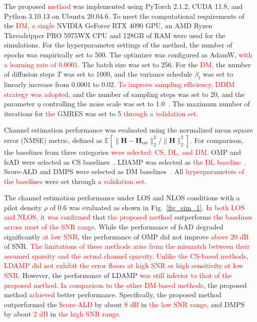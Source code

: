 \documentclass[lettersize,journal]{IEEEtran}
\newcommand{\tred}{\textcolor{red}}
\begin{document}
The proposed \tred{method} was implemented using PyTorch 2.1.2, CUDA 11.8, and Python 3.10.13 on Ubuntu 20.04.6. To meet the computational requirements of the \tred{DM}, \tred{a single} NVIDIA GeForce RTX 4090 GPU, an AMD Ryzen Threadripper PRO 5975WX CPU and 128GB of RAM were used for the simulations. For the hyperparameter settings of the method, the number of epochs was empirically set to 500. The optimizer was configured as AdamW, \tred{with a learning rate of 0.0001}. The batch size was set to 256. %
For the \tred{DM}, the number of diffusion steps $T$ was set to 1000, and the variance schedule $\beta_{t}$ was set to linearly increase from 0.0001 to 0.02. \tred{To improve sampling efficiency, DDIM strategy was adopted,} and the number of sampling steps was set to 20, and the parameter $\eta$ controlling the noise scale was set to 1.0~\cite{songDenoisingDiffusionImplicit2020}. The maximum number of iterations for \tred{the} GMRES was set to 5 \tred{through a validation set}.

Channel estimation performance was evaluated using the normalized mean square error (NMSE) metric, defined as $\mathbb{E}[\|\mathbf{H}-\mathbf{H}_{\text{est}}\|_{2}^{2} / \|\mathbf{H}\|_{2}^{2}]$. For comparison, the baselines from three categories \tred{were selected: CS, DL, and DM}. OMP and fsAD were selected as CS baselines~\cite{mendez-rialHybridMIMOArchitectures2016,zhangAtomicNormDenoisingBased2018}. LDAMP was selected as \tred{the DL baseline}~\cite{heDeepLearningBasedChannel2018}. Score-ALD and DMPS were selected as DM baselines~\cite{arvinteMIMOChannelEstimation2023,zhouGenerativeDiffusionModels2025}. All \tred{hyperparameters of the baselines} were set through \tred{a validation set}.

The channel estimation performance under LOS and NLOS conditions with a pilot density $\rho$ of 0.6 was evaluated as shown in Fig.~\ref{fig_sim_1}. \tred{In both LOS and NLOS, it was confirmed} that \tred{the proposed method} outperforms \tred{the baselines across most of the SNR range}. While the performance of fsAD degraded significantly \tred{at low SNR}, the performance of OMP did not improve \tred{above 20 dB} of SNR. \tred{The limitations of these methods arise from the mismatch between their assumed sparsity and the actual channel sparsity.} \tred{Unlike the CS-based methods, LDAMP did not exhibit the error floors at high SNR or high sensitivity at low SNR.} However, the performance of LDAMP \tred{was still inferior to that of the proposed method}. \tred{In comparison to the other DM-based methods}, the proposed method \tred{achieved} better performance. Specifically, the proposed method outperformed the \tred{Score-ALD} by about \tred{8 dB} in \tred{the low SNR range}, and DMPS by about \tred{2 dB} in \tred{the high SNR range}.
\end{document}
